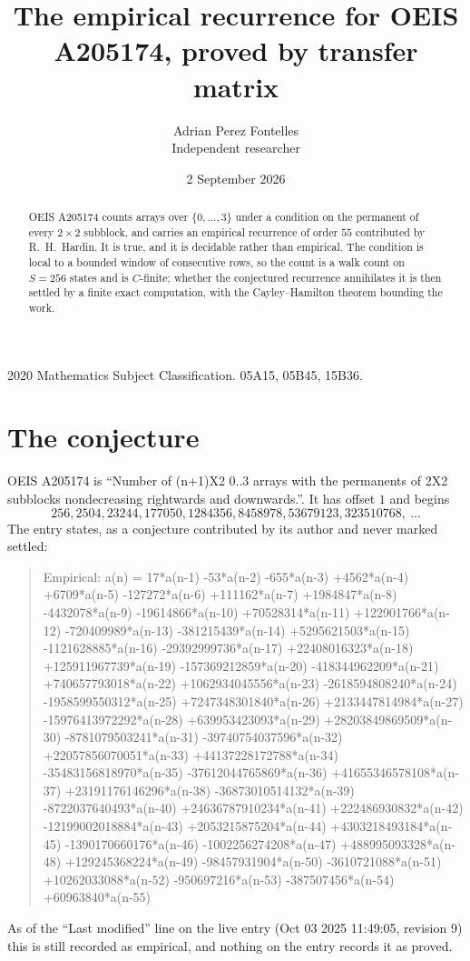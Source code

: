 \documentclass[11pt,a4paper]{article}
\title{The empirical recurrence for OEIS A205174, proved by transfer matrix}
\author{Adrian Perez Fontelles\\ \small Independent researcher}
\date{2 September 2026}
\theoremstyle{plain}
\theoremstyle{definition}
\begin{document}
\maketitle

\begin{abstract}
OEIS A205174 counts arrays over $\{0,\dots,3\}$ under a condition on the permanent of every
$2\times2$ subblock, and carries an empirical recurrence of order $55$ contributed by
R.~H.~Hardin. It is true, and it is decidable rather than empirical. The condition is local to
a bounded window of consecutive rows, so the count is a walk count on $S=256$ states and is
$C$-finite; whether the conjectured recurrence annihilates it is then settled by a finite exact
computation, with the Cayley--Hamilton theorem bounding the work.
\end{abstract}

\noindent\small 2020 Mathematics Subject Classification. 05A15, 05B45, 15B36.\normalsize

\section{The conjecture}

OEIS A205174 is ``Number of (n+1)X2 0..3 arrays with the permanents of 2X2 subblocks nondecreasing rightwards and downwards.''. It has offset $1$ and begins
\[
256, 2504, 23244, 177050, 1284356, 8458978, 53679123, 323510768,\ \dots
\]
The entry states, as a conjecture contributed by its author and never marked settled:
\begin{quote}
Empirical: a(n) = 17*a(n-1) -53*a(n-2) -655*a(n-3) +4562*a(n-4) +6709*a(n-5) -127272*a(n-6) +111162*a(n-7) +1984847*a(n-8) -4432078*a(n-9) -19614866*a(n-10) +70528314*a(n-11) +122901766*a(n-12) -720409989*a(n-13) -381215439*a(n-14) +5295621503*a(n-15) -1121628885*a(n-16) -29392999736*a(n-17) +22408016323*a(n-18) +125911967739*a(n-19) -157369212859*a(n-20) -418344962209*a(n-21) +740657793018*a(n-22) +1062934045556*a(n-23) -2618594808240*a(n-24) -1958599550312*a(n-25) +7247348301840*a(n-26) +2133447814984*a(n-27) -15976413972292*a(n-28) +639953423093*a(n-29) +28203849869509*a(n-30) -8781079503241*a(n-31) -39740754037596*a(n-32) +22057856070051*a(n-33) +44137228172788*a(n-34) -35483156818970*a(n-35) -37612044765869*a(n-36) +41655346578108*a(n-37) +23191176146296*a(n-38) -36873010514132*a(n-39) -8722037640493*a(n-40) +24636787910234*a(n-41) +222486930832*a(n-42) -12199002018884*a(n-43) +2053215875204*a(n-44) +4303218493184*a(n-45) -1390170660176*a(n-46) -1002256274208*a(n-47) +488995093328*a(n-48) +129245368224*a(n-49) -98457931904*a(n-50) -3610721088*a(n-51) +10262033088*a(n-52) -950697216*a(n-53) -387507456*a(n-54) +60963840*a(n-55)
\end{quote}
As of the ``Last modified'' line on the live entry (Oct 03 2025 11:49:05, revision 9) this is still
recorded as empirical, and nothing on the entry records it as proved.
\end{document}
